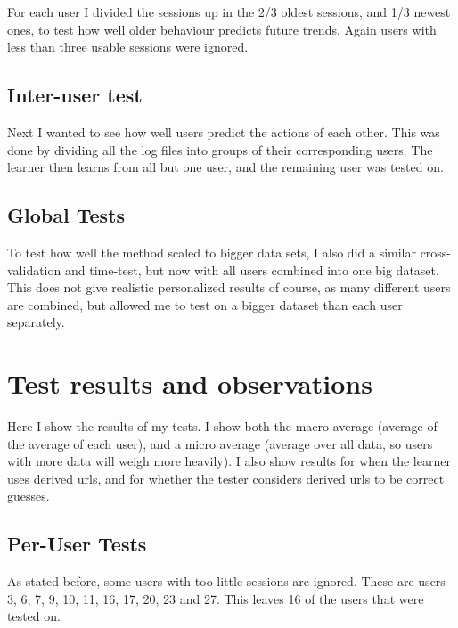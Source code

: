 \documentclass{article}
\begin{document}
For each user I divided the sessions up in the 2/3 oldest sessions, and 1/3 newest ones, to test how well older behaviour predicts future trends.
Again users with less than three usable sessions were ignored.

\subsection{Inter-user test}

Next I wanted to see how well users predict the actions of each other.
This was done by dividing all the log files into groups of their corresponding users.
The learner then learns from all but one user, and the remaining user was tested on.

\subsection{Global Tests}

To test how well the method scaled to bigger data sets, I also did a similar cross-validation and time-test, but now with all users combined into one big dataset.
This does not give realistic personalized results of course, as many different users are combined, but allowed me to test on a bigger dataset than each user separately.

\section{Test results and observations}

Here I show the results of my tests.
I show both the macro average (average of the average of each user), and a micro average (average over all data, so users with more data will weigh more heavily).
I also show results for when the learner uses derived urls, and for whether the tester considers derived urls to be correct guesses.

\subsection{Per-User Tests}

As stated before, some users with too little sessions are ignored. These are users 3, 6, 7, 9, 10, 11, 16, 17, 20, 23 and 27.
This leaves 16 of the users that were tested on.
\end{document}
